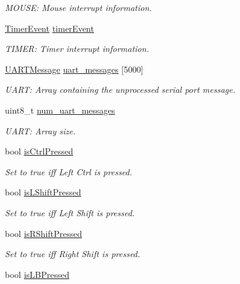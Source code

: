 \begin{DoxyCompactItemize}
\begin{DoxyCompactList}\small\item\em M\+O\+U\+SE\+: Mouse interrupt information. \end{DoxyCompactList}\item 
\mbox{\hyperlink{struct_timer_event}{Timer\+Event}} \mbox{\hyperlink{group__event_ga00faceeda48c11ab73d93386410fb947}{timer\+Event}}
\begin{DoxyCompactList}\small\item\em T\+I\+M\+ER\+: Timer interrupt information. \end{DoxyCompactList}\item 
\mbox{\hyperlink{struct_u_a_r_t_message}{U\+A\+R\+T\+Message}} \mbox{\hyperlink{group__event_ga5328c084dbec907fc5764e3bc22d15c1}{uart\+\_\+messages}} \mbox{[}5000\mbox{]}
\begin{DoxyCompactList}\small\item\em U\+A\+RT\+: Array containing the unprocessed serial port message. \end{DoxyCompactList}\item 
uint8\+\_\+t \mbox{\hyperlink{group__event_ga06510bc0368c992c639e98d32ddf1f08}{num\+\_\+uart\+\_\+messages}}
\begin{DoxyCompactList}\small\item\em U\+A\+RT\+: Array size. \end{DoxyCompactList}\item 
bool \mbox{\hyperlink{group__event_ga6889574ecb91bfdbfb6970744500343d}{is\+Ctrl\+Pressed}}
\begin{DoxyCompactList}\small\item\em Set to true iff Left Ctrl is pressed. \end{DoxyCompactList}\item 
bool \mbox{\hyperlink{group__event_gad1fa4519784799da6a38747199ff898f}{is\+L\+Shift\+Pressed}}
\begin{DoxyCompactList}\small\item\em Set to true iff Left Shift is pressed. \end{DoxyCompactList}\item 
bool \mbox{\hyperlink{group__event_ga63dc7ccca6afe5c67f51147f763e851d}{is\+R\+Shift\+Pressed}}
\begin{DoxyCompactList}\small\item\em Set to true iff Right Shift is pressed. \end{DoxyCompactList}\item 
bool \mbox{\hyperlink{group__event_ga6bd25b846a78fabf96eaa267cdead1a0}{is\+L\+B\+Pressed}}

\end{DoxyCompactItemize}
